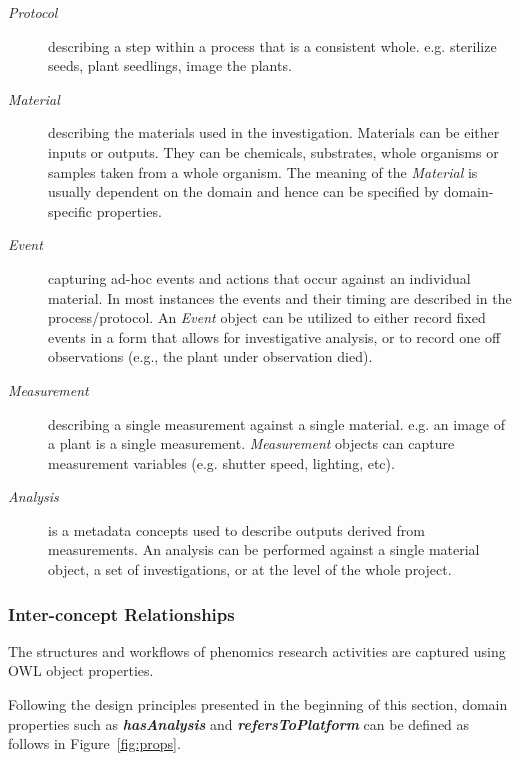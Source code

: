 \documentclass{elsarticle}
\begin{document}
\begin{description}
\item[\emph{Protocol}] describing a step within a process that is a
consistent whole. e.g. sterilize seeds, plant seedlings, image the
plants.

\item[\emph{Material}] describing the materials used in the
investigation. Materials can be either inputs or outputs. They can
be chemicals, substrates, whole organisms or samples taken from a
whole organism. The meaning of the \emph{Material} is usually
dependent on the domain and hence can be specified by domain-specific
properties.

\item[\emph{Event}] capturing ad-hoc events and actions that occur
against an individual material. In most instances the events and
their timing are described in the process/protocol. An \emph{Event} object
can be utilized to either record fixed events in a form that allows
for investigative analysis, or to record one off observations (e.g., the
plant under observation died).

\item[\emph{Measurement}] describing a single measurement against a
single material. e.g. an image of a plant is a single measurement.
\emph{Measurement} objects can capture measurement variables (e.g. shutter
speed, lighting, etc).

\item[\emph{Analysis}] is a metadata concepts used to describe
outputs derived from measurements. An analysis can be performed
against a single material object, a set of investigations,
or at the level of the whole project.
\end{description}

\subsubsection{Inter-concept Relationships}
The structures and workflows of phenomics research activities are
captured using OWL object properties.


Following the design principles presented in the beginning of this
section, domain properties such as \textbf{\emph{hasAnalysis}}
and \textbf{\emph{refersToPlatform}} can be defined as follows
in Figure~\ref{fig:props}.
\end{document}
